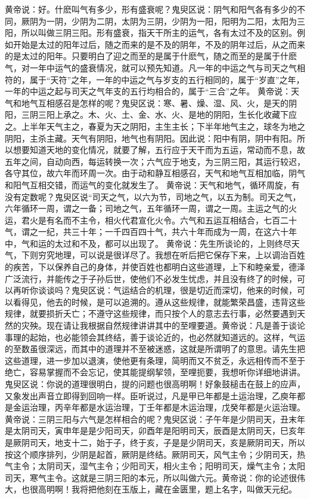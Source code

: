 \documentclass[a4paper,12pt,UTF8,twoside]{ctexbook}
\begin{document}
黄帝说：好。什麽叫气有多少，形有盛衰呢？鬼臾区说：阴气和阳气各有多少的不同，厥阴为一阴，少阴为二阴，太阴为三阴，少阴为一阳，阳明为二阳，太阳为三阳，所以叫做三阴三阳。形有盛衰，指天干所主的运气，各有太过不及的区别。例如开始是太过的阳年过后，随之而来的是不及的阴年，不及的阴年过后，从之而来的是太过的阳年。只要明白了迎之而至的是属于什麽气，随之而至的是属于什麽气，对一年中运气的盛衰情况，就可以预先知道。凡一年的中运之气与司天之气相符的，属于“天符”之年，一年的中运之气与岁支的五行相同的，属于“岁直”之年，一年的中运之起与司天之气年支的五行均相合的，属于“三合”之年。
黄帝说：天气和地气互相感召是怎样的呢？鬼臾区说：寒、暑、燥、湿、风、火，是天的阴阳，三阴三阳上承之。木、火、土、金、水、火、是地的阴阳，生长化收藏下应之。上半年天气主之，春夏为天之阴阳，主生主长；下半年地气主之，球冬为地之阴阳，主杀主藏。天气有阴阳，地气也有阴阳。因此说：阳中有阴，阴中有阳。所以想要知道天地的变化情况，就要了解，五行应于天干而为五运，常动而不息，故五年之间，自动向西，每运转换一次；六气应于地支，为三阴三阳，其运行较迟，各守其位，故六年而环周一次。由于动和静互相感召，天气和地气互相加临，阴气和阳气互相交错，而运气的变化就发生了。
黄帝说：天气和地气，循环周旋，有没有定数呢？鬼臾区说“司天之气，以六为节，司地之气，以五为制。司天之气，六年循环一周，谓之一备；司地之气，五年循环一周，谓之一周。主运之气的火运，君火是有名而不主令，相火代君宣化火令。六气和五运互相结合，七百二十气，谓之一纪，共三十年；一千四百四十气，共六十年而成为一周，在这六十年中，气和运的太过和不及，都可以出现了。
黄帝说：先生所谈论的，上则终尽天气，下则穷究地理，可以说是很详尽了。我想在听后把它保存下来，上以调治百姓的疾苦，下以保养自己的身体，并使百姓也都明白这些道理，上下和睦亲爱，德泽广泛流行，并能传之于子孙后世，使他们不必发生忧虑，并且没有终了的时候，可以再听你谈谈吗？鬼臾区说：气运结合的机理，很是切近而深切，他来的时候，可以看得见，他去的时候，是可以追溯的。遵从这些规律，就能繁荣昌盛，违背这些规律，就要损折夭亡；不遵守这些规律，而只按个人的意志去行事，必然要遇到天然的灾殃。现在请让我根据自然规律讲讲其中的至哩要道。黄帝说：凡是善于谈论事理的起始，也必能领会其终结，善于谈论近的，也必然就知道远的。这样，气运的至数虽很深远，而其中的道理并不至被迷惑，这就是所谓明了的意思。请先生把这些道理，进一步加以退演，使他更有条理，简明而又不贫乏，永远相传而不至于绝亡，容易掌握而不会忘记，使其能提纲挈领，至哩扼要，我想听你详细地讲讲。鬼臾区说：你说的道理很明白，提的问题也很高明啊！好象鼓槌击在鼓上的应声，又象发出声音立即得到回响一样。臣听说过，凡是甲已年都是土运治理，乙庾年都是金运治理，丙辛年都是水运治理，丁壬年都是木运治理，戊癸年都是火运治理。
黄帝说：三阴三阳与六气是怎样相合的呢？鬼臾区说：子午年是少阴司天，丑末年是太阴司天，寅申年是是少阳司天，卯酉年是阳明司天，辰酉是太阴司天，巳亥年是厥阴司天，地支十二，始于子，终于亥，子是是少阴司天，亥是厥阴司天，所以按这个顺序排列，少阴是起首，厥阴是终结。厥阴司天，风气主令；少阴司天，热气主令；太阴司天，湿气主令；少阳司天，相火主令；阳明司天，燥气主令；太阳司天，寒气主令。这就是三阴三阳的本元，所以叫做六元。黄帝说：你的论述很伟大，也很高明啊！我将把他刻在玉版上，藏在金匮里，题上名字，叫做天元纪。
\end{document}
